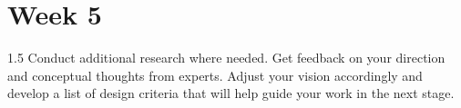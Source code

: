 \documentclass[final]{scrreprt} %
\begin{document}
\chapter{Week 5}
1.5 Conduct additional research where needed. Get feedback on your direction and 
conceptual thoughts from experts. Adjust your vision accordingly and develop a 
list of design criteria that will help guide your work in the next stage. 
\end{document}
